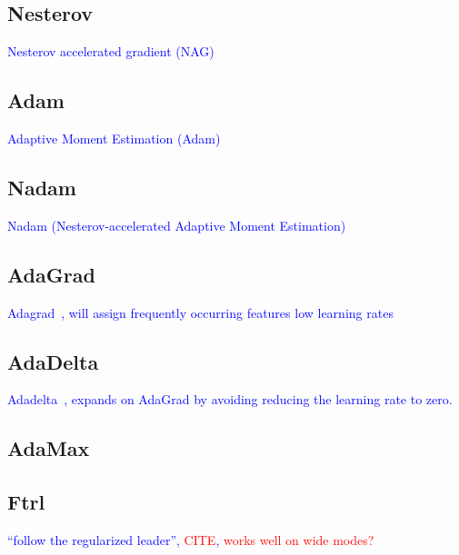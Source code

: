 \subsection{Nesterov}

\textcolor{blue}{Nesterov accelerated gradient (NAG)}

\subsection{Adam}

\textcolor{blue}{Adaptive Moment Estimation (Adam)~\cite{kingma2014adam}}



\subsection{Nadam}

\textcolor{blue}{Nadam (Nesterov-accelerated Adaptive Moment Estimation)~\cite{dozat2016incorporating}}

\subsection{AdaGrad}

\textcolor{blue}{Adagrad~\cite{duchi2011adaptive}, will assign frequently occurring features low learning rates}

\subsection{AdaDelta}

\textcolor{blue}{Adadelta~\cite{zeiler2012adadelta}, expands on AdaGrad by avoiding reducing the learning rate to zero.}

\subsection{AdaMax}

\subsection{Ftrl}

\textcolor{blue}{``follow the regularized leader'', \textcolor{red}{CITE}, \textcolor{red}{works well on wide modes?}}





